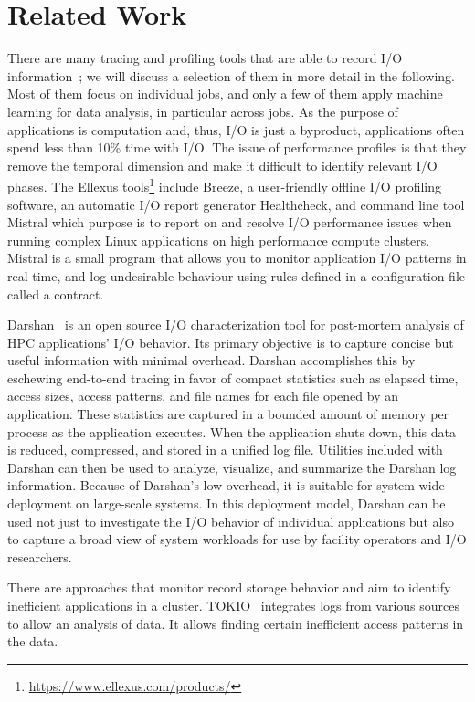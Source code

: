 \documentclass{jhps}
\begin{document}
\section{Related Work}%
\label{sec:rel_work}
There are many tracing and profiling tools that are able to record I/O information~\cite{TFAPIKBBCF19}; we will discuss a selection of them in more detail in the following.
Most of them focus on individual jobs, and only a few of them apply machine learning for data analysis, in particular across jobs.
As the purpose of applications is computation and, thus, I/O is just a byproduct, applications often spend less than 10\% time with I/O.
The issue of performance profiles is that they remove the temporal dimension and make it difficult to identify relevant I/O phases.
The Ellexus tools\footnote{\url{https://www.ellexus.com/products/}} include Breeze, a user-friendly offline I/O profiling software, an automatic I/O report generator Healthcheck, and command line tool Mistral which purpose is to report on and resolve I/O performance issues when running complex Linux applications on high performance compute clusters.
Mistral is a small program that allows you to monitor application I/O patterns in real time, and log undesirable behaviour using rules defined in a configuration file called a contract.

Darshan~\cite{carns2011understanding-toc,hpcdarshan} is an open source I/O characterization tool for post-mortem analysis of HPC applications' I/O behavior.
Its primary objective is to capture concise but useful information with minimal overhead.
Darshan accomplishes this by eschewing end-to-end tracing in favor of compact statistics such as elapsed time, access sizes, access patterns, and file names for each file opened by an application.
These statistics are captured in a bounded amount of memory per process as the application executes.
When the application shuts down, this data is reduced, compressed, and stored in a unified log file.
Utilities included with Darshan can then be used to analyze, visualize, and summarize the Darshan log information.
Because of Darshan's low overhead, it is suitable for system-wide deployment on large-scale systems.
In this deployment model, Darshan can be used not just to investigate the I/O behavior of individual applications but also to capture a broad view of system workloads for use by facility operators and I/O researchers.


There are approaches that monitor record storage behavior and aim to identify inefficient applications in a cluster.
TOKIO~\cite{lockwood2018tokio} integrates logs from various sources to allow an analysis of data.
It allows finding certain inefficient access patterns in the data.
\end{document}
